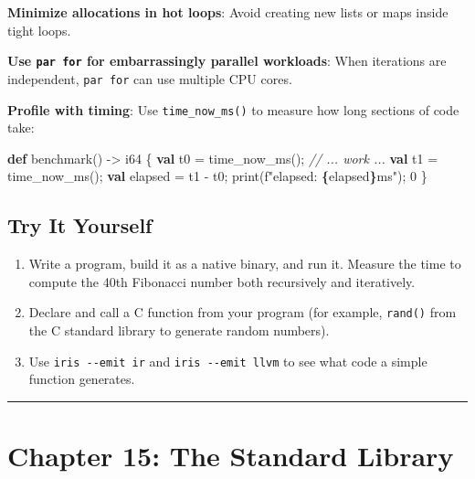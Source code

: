 \documentclass[
  english,
]{book}
\newenvironment{Shaded}{\begin{snugshade}}{\end{snugshade}}
\newcommand{\CommentTok}[1]{\textcolor[rgb]{0.42,0.60,0.33}{\textit{#1}}}
\newcommand{\ControlFlowTok}[1]{\textcolor[rgb]{0.77,0.53,0.75}{\textbf{#1}}}
\newcommand{\DataTypeTok}[1]{\textcolor[rgb]{0.31,0.79,0.69}{#1}}
\newcommand{\DecValTok}[1]{\textcolor[rgb]{0.71,0.81,0.66}{#1}}
\newcommand{\FunctionTok}[1]{\textcolor[rgb]{0.86,0.86,0.67}{#1}}
\newcommand{\KeywordTok}[1]{\textcolor[rgb]{0.34,0.61,0.84}{\textbf{#1}}}
\newcommand{\NormalTok}[1]{\textcolor[rgb]{0.83,0.83,0.83}{#1}}
\newcommand{\OperatorTok}[1]{\textcolor[rgb]{0.83,0.83,0.83}{#1}}
\newcommand{\StringTok}[1]{\textcolor[rgb]{0.81,0.57,0.47}{#1}}
\providecommand{\tightlist}{%
  \setlength{\itemsep}{0pt}\setlength{\parskip}{0pt}}
\begin{document}
\textbf{Minimize allocations in hot loops}: Avoid creating new lists or
maps inside tight loops.

\textbf{Use \texttt{par\ for} for embarrassingly parallel workloads}:
When iterations are independent, \texttt{par\ for} can use multiple CPU
cores.

\textbf{Profile with timing}: Use \texttt{time\_now\_ms()} to measure
how long sections of code take:

\begin{Shaded}
\begin{Highlighting}[]
\KeywordTok{def}\NormalTok{ benchmark() }\OperatorTok{{-}\textgreater{}} \DataTypeTok{i64}\NormalTok{ \{}
    \KeywordTok{val}\NormalTok{ t0 }\OperatorTok{=}\NormalTok{ time\_now\_ms();}
    \CommentTok{// ... work ...}
    \KeywordTok{val}\NormalTok{ t1 }\OperatorTok{=}\NormalTok{ time\_now\_ms();}
    \KeywordTok{val}\NormalTok{ elapsed }\OperatorTok{=}\NormalTok{ t1 }\OperatorTok{{-}}\NormalTok{ t0;}
    \FunctionTok{print}\NormalTok{(}\StringTok{f"elapsed: }\ControlFlowTok{\{}\NormalTok{elapsed}\ControlFlowTok{\}}\StringTok{ms"}\NormalTok{);}
    \DecValTok{0}
\NormalTok{\}}
\end{Highlighting}
\end{Shaded}

\subsection{Try It Yourself}\label{try-it-yourself-13}

\begin{enumerate}
\def\labelenumi{\arabic{enumi}.}
\tightlist
\item
  Write a program, build it as a native binary, and run it. Measure the
  time to compute the 40th Fibonacci number both recursively and
  iteratively.
\item
  Declare and call a C function from your program (for example,
  \texttt{rand()} from the C standard library to generate random
  numbers).
\item
  Use \texttt{iris\ -\/-emit\ ir} and \texttt{iris\ -\/-emit\ llvm} to
  see what code a simple function generates.
\end{enumerate}

\begin{center}\rule{0.5\linewidth}{0.5pt}\end{center}

\section{Chapter 15: The Standard
Library}\label{chapter-15-the-standard-library}
\end{document}
